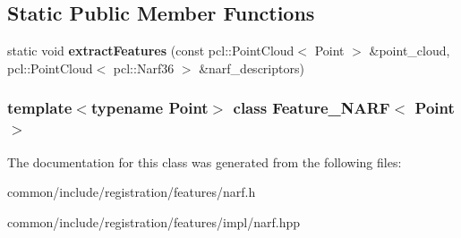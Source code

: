 \subsection*{Static Public Member Functions}
\begin{DoxyCompactItemize}
\item 
\hypertarget{classFeature__NARF_a472d7f903789b0c828f03f25fb0f6acc}{
static void {\bfseries extractFeatures} (const pcl::PointCloud$<$ Point $>$ \&point\_\-cloud, pcl::PointCloud$<$ pcl::Narf36 $>$ \&narf\_\-descriptors)}
\label{classFeature__NARF_a472d7f903789b0c828f03f25fb0f6acc}

\end{DoxyCompactItemize}
\subsubsection*{template$<$typename Point$>$ class Feature\_\-NARF$<$ Point $>$}



The documentation for this class was generated from the following files:\begin{DoxyCompactItemize}
\item 
common/include/registration/features/narf.h\item 
common/include/registration/features/impl/narf.hpp\end{DoxyCompactItemize}
